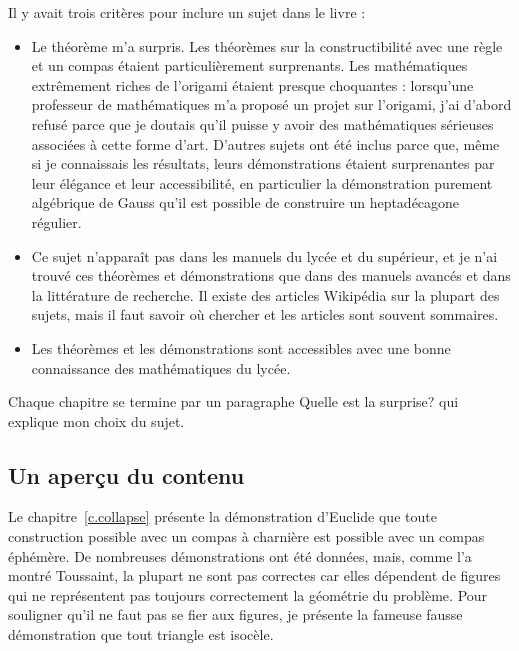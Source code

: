 Il y avait trois critères pour inclure un sujet dans le livre :
\begin{itemize}
\item Le théorème m'a surpris. Les théorèmes sur la constructibilité avec une règle et un compas étaient particulièrement surprenants. Les mathématiques extrêmement riches de l'origami étaient presque choquantes : lorsqu'une  professeur de mathématiques m'a proposé un projet sur l'origami, j'ai d'abord refusé parce que je doutais qu'il puisse y avoir des mathématiques sérieuses associées à cette forme d'art.
D'autres sujets ont été inclus parce que, même si je connaissais les résultats, leurs démonstrations  étaient surprenantes par leur élégance et leur accessibilité, en particulier la démonstration  purement algébrique de Gauss qu'il est possible de construire un heptadécagone régulier.

\item Ce sujet n'apparaît pas dans les manuels du lycée  et du supérieur, et je n'ai trouvé ces théorèmes et démonstrations que dans des manuels avancés et dans la littérature de recherche. Il existe des articles Wikipédia sur la plupart des sujets, mais il faut savoir où chercher et les articles sont souvent sommaires.

\item Les théorèmes et les démonstrations  sont accessibles avec une bonne connaissance des mathématiques du lycée.
\end{itemize}
Chaque chapitre se termine par un paragraphe \og Quelle est la surprise?\fg{} qui explique mon choix du sujet.

\subsection*{Un aperçu du contenu}

Le chapitre~\ref{c.collapse} présente la démonstration d'Euclide que toute construction possible avec un compas à charnière est possible avec un compas éphémère. De nombreuses démonstrations ont été données, mais, comme l'a montré  Toussaint, la plupart ne sont pas correctes car elles dépendent de figures qui ne représentent pas toujours correctement la géométrie du problème. Pour souligner qu'il ne faut pas se fier aux figures, je présente la fameuse fausse démonstration  que tout triangle est isocèle. 

